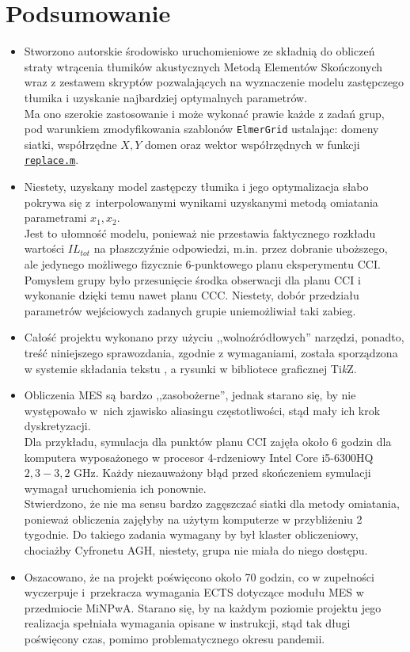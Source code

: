 \documentclass{sprawozdanie-agh}
\begin{document}
\section{Podsumowanie}
\newcommand{\TikZ}{Ti\textit{k}Z\xspace}
\begin{itemize}
    \item Stworzono autorskie środowisko uruchomieniowe ze składnią do obliczeń straty wtrącenia tłumików akustycznych Metodą Elementów Skończonych wraz z zestawem skryptów pozwalających na wyznaczenie modelu zastępczego tłumika i uzyskanie najbardziej optymalnych parametrów.\\Ma ono szerokie zastosowanie i może wykonać prawie każde z zadań grup, pod warunkiem zmodyfikowania szablonów \texttt{ElmerGrid} ustalając: domeny siatki, współrzędne $X,Y$ domen oraz wektor współrzędnych w funkcji \hyperref[list5]{\texttt{replace.m}}.
    \item Niestety, uzyskany model zastępczy tłumika i jego optymalizacja słabo pokrywa się z~interpolowanymi wynikami uzyskanymi metodą omiatania parametrami $x_1, x_2$.\\Jest to ułomność modelu, ponieważ nie przestawia faktycznego rozkładu wartości $IL_{tot}$ na płaszczyźnie odpowiedzi, m.in. przez dobranie uboższego, ale jedynego możliwego fizycznie 6-punktowego planu eksperymentu CCI. Pomysłem grupy było przesunięcie środka obserwacji dla planu CCI i wykonanie dzięki temu nawet planu CCC. Niestety, dobór przedziału parametrów wejściowych zadanych grupie uniemożliwiał taki zabieg.
    \item Całość projektu wykonano przy użyciu ,,wolnoźródłowych'' narzędzi, ponadto, treść niniejszego sprawozdania, zgodnie z wymaganiami, została sporządzona w systemie składania tekstu \LaTeXe{}, a rysunki w bibliotece graficznej \TikZ.
    \item Obliczenia MES są bardzo ,,zasobożerne'', jednak starano się, by nie występowało w~nich zjawisko aliasingu częstotliwości, stąd mały ich krok dyskretyzacji.\\Dla przykładu, symulacja dla punktów planu CCI zajęła około 6 godzin dla komputera wyposażonego w procesor 4-rdzeniowy Intel Core i5-6300HQ $2,3-3,2$ GHz. Każdy niezauważony błąd przed skończeniem symulacji wymagał uruchomienia ich ponownie.\\Stwierdzono, że nie ma sensu bardzo zagęszczać siatki dla metody omiatania, ponieważ obliczenia zajęłyby na użytym komputerze w przybliżeniu 2 tygodnie. Do takiego zadania wymagany by był klaster obliczeniowy, chociażby Cyfronetu AGH, niestety, grupa nie miała do niego dostępu.
    \item Oszacowano, że na projekt poświęcono około 70 godzin, co w zupełności wyczerpuje i~przekracza wymagania ECTS dotyczące modułu MES w przedmiocie MiNPwA. Starano się, by na każdym poziomie projektu jego realizacja spełniała wymagania opisane w instrukcji, stąd tak długi poświęcony czas, pomimo problematycznego okresu pandemii.
\end{itemize}
\end{document}
